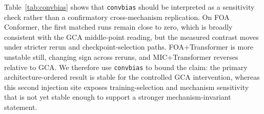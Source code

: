 Table~\ref{tab:convbias} shows that \texttt{convbias} should be interpreted as a
sensitivity check rather than a confirmatory cross-mechanism replication. On
FOA Conformer, the first matched runs remain close to zero, which is broadly
consistent with the GCA middle-point reading, but the measured contrast moves
under stricter rerun and checkpoint-selection paths. FOA+Transformer is more
unstable still, changing sign across reruns, and MIC+Transformer reverses
relative to GCA. We therefore use \texttt{convbias} to bound the claim: the
primary architecture-ordered result is stable for the controlled GCA
intervention, whereas this second injection site exposes training-selection and
mechanism sensitivity that is not yet stable enough to support a stronger
mechanism-invariant statement.

\begin{table}[t]
\centering
\caption{Second injection check on DOAE$_\mathrm{CD}$. GCA injects geometry
inside channel-attention keys ($n=5$). \texttt{convbias} injects geometry as an
early per-filter convolutional feature bias ($n=3$ per run). Each entry is
$\Delta=\text{full}-\text{no\_geom}$ in degrees (negative $=$ helps). Rather than
confirming a mechanism-invariant effect, the \texttt{convbias} reruns act as a
sensitivity audit: the Conformer stays near-neutral in early runs, whereas
Transformer contrasts and deterministic SELD-selection reruns reveal substantial
mechanism and checkpoint sensitivity.}
\label{tab:convbias}
\scriptsize
\setlength{\tabcolsep}{3pt}
\end{table}

